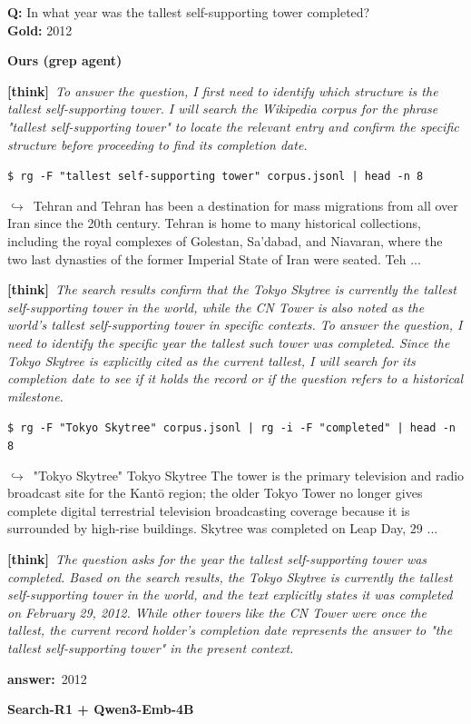 \documentclass{llmxive}
\providecommand{\cmark}{\ding{51}}
\providecommand{\xmark}{\ding{55}}
\providecommand{\winbadge}{\colorbox{green!50!black}{\scriptsize\bfseries\,WIN\,}}
\providecommand{\thk}[1]{{\footnotesize\textbf{[think]}\ \textit{#1}\par}}
\providecommand{\cmd}[1]{{\footnotesize\texttt{\$\ #1}\par}}
\providecommand{\retr}[1]{{\footnotesize\quad$\hookrightarrow$\ #1\par}}
\providecommand{\ans}[1]{{\footnotesize\textbf{answer:}\ #1\par}}
\begin{document}
\begin{cmpbox}[label={ex:bamboogle-skytree},title={\winbadge\ \ \textsc{Bamboogle -- current vs.\ stale record-holder}}]
\textbf{Q:} In what year was the tallest self-supporting tower completed?\\[1pt]
\textbf{Gold:} 2012\par\smallskip
\textbf{Ours (grep agent)}~\cmark\par
  \thk{To answer the question, I first need to identify which structure is the tallest self-supporting tower. I will search the Wikipedia corpus for the phrase "tallest self-supporting tower" to locate the relevant entry and confirm the specific structure before proceeding to find its completion date.}
  \cmd{rg -F "tallest self-supporting tower" corpus.jsonl | head -n 8}
  \retr{Tehran and Tehran has been a destination for mass migrations from all over Iran since the 20th century. Tehran is home to many historical collections, including the royal complexes of Golestan, Sa'dabad, and Niavaran, where the two last dynasties of the former Imperial State of Iran were seated. Teh ...}
  \thk{The search results confirm that the Tokyo Skytree is currently the tallest self-supporting tower in the world, while the CN Tower is also noted as the world's tallest self-supporting tower in specific contexts. To answer the question, I need to identify the specific year the tallest such tower was completed. Since the Tokyo Skytree is explicitly cited as the current tallest, I will search for its completion date to see if it holds the record or if the question refers to a historical milestone.}
  \cmd{rg -F "Tokyo Skytree" corpus.jsonl | rg -i -F "completed" | head -n 8}
  \retr{"Tokyo Skytree" Tokyo Skytree The tower is the primary television and radio broadcast site for the Kantō region; the older Tokyo Tower no longer gives complete digital terrestrial television broadcasting coverage because it is surrounded by high-rise buildings. Skytree was completed on Leap Day, 29 ...}
  \thk{The question asks for the year the tallest self-supporting tower was completed. Based on the search results, the Tokyo Skytree is currently the tallest self-supporting tower in the world, and the text explicitly states it was completed on February 29, 2012. While other towers like the CN Tower were once the tallest, the current record holder's completion date represents the answer to "the tallest self-supporting tower" in the present context.}
  \ans{2012}
\smallskip\par\textbf{Search-R1 + Qwen3-Emb-4B}~\xmark\par

\end{cmpbox}
\end{document}
